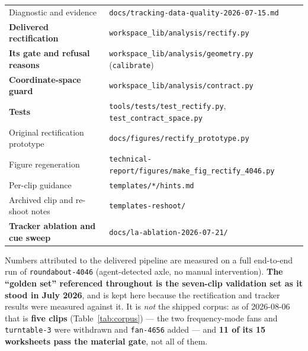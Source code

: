 \documentclass[11pt,a4paper]{article}
\begin{document}
\begin{tabular}{@{}ll@{}}
Diagnostic and evidence & \texttt{docs/tracking-data-quality-2026-07-15.md} \\
\textbf{Delivered rectification} & \texttt{workspace\_lib/analysis/rectify.py} \\
\textbf{Its gate and refusal reasons} & \texttt{workspace\_lib/analysis/geometry.py} (\texttt{calibrate}) \\
\textbf{Coordinate-space guard} & \texttt{workspace\_lib/analysis/contract.py} \\
\textbf{Tests} & \texttt{tools/tests/test\_rectify.py}, \texttt{test\_contract\_space.py} \\
Original rectification prototype & \texttt{docs/figures/rectify\_prototype.py} \\
Figure regeneration & \texttt{technical-report/figures/make\_fig\_rectify\_4046.py} \\
Per-clip guidance & \texttt{templates/*/hints.md} \\
Archived clip and re-shoot notes & \texttt{templates-reshoot/} \\
\textbf{Tracker ablation and cue sweep} & \texttt{docs/la-ablation-2026-07-21/} \\
\end{tabular}

\vspace{4pt}
\noindent Numbers attributed to the delivered pipeline are measured on a full end-to-end run of
\texttt{roundabout-4046} (agent-detected axle, no manual intervention). \textbf{The ``golden set''
referenced throughout is the seven-clip validation set as it stood in July 2026}, and is kept here
because the rectification and tracker results were measured against it. It is \emph{not} the
shipped corpus: as of 2026-08-06 that is \textbf{five clips} (Table~\ref{tab:corpus}) --- the two
frequency-mode fans and \texttt{turntable-3} were withdrawn and \texttt{fan-4656} added --- and
\textbf{11 of its 15 worksheets pass the material gate}, not all of them.
\end{document}
